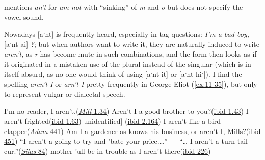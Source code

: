 \citet[\href{https://archive.org/details/bim_eighteenth-century_the-principles-of-the-en_elphinston-james_1765_1/page/134/mode/2up?view=theater&q=sink}{1.134}]{elphinston1765principles} 
mentions \textit{an't} for \textit{am not} with ``sinking'' of \textit{m} and \textit{o} but does not specify the vowel sound.


Nowadays [aˑnt] is frequently heard, especially in tag-questions: \textit{I'm a bad boy,} [aˑnt ai] \textit{?}; but when authors want to write it, they are naturally induced to write \textit{aren't}, as \textit{r} has become mute in such combinations, and the form then looks as if it originated in a mistaken use of the plural instead of the singular (which is in itself absurd, as no one would think of using [aˑnt it] or [aˑnt hiˑ]). I find the spelling \textit{aren't I} or \textit{arn't I} pretty frequently in George Eliot (\ref{ex:11-35}), but only to represent vulgar or dialectal speech.

\ea \label{ex:11-35}
\ea
I'm no reader, I aren't.\hfill(\href{https://archive.org/details/millonfloss0009geor/page/28/mode/2up?q=%22aren%27t%22&view=theater}{\textit{Mill} 1.34})
\ex Aren't I a good brother to you?\hfill(\href{https://archive.org/details/millonfloss0009geor/page/36/mode/2up?q=%22aren%27t%22&view=theater}{ibid 1.43})
\ex I aren't frighted\hfill(\href{https://archive.org/details/millonfloss0009geor/page/52/mode/2up?q=%22aren%27t%22&view=theater}{ibid 1.63})
\ex {[}unidentified{]} \hfill(\href{}{ibid 2.164}) %
\ex I aren't like a bird-clapper\hfill(\href{https://archive.org/details/adambede00eliouoft/page/n463/mode/2up?q=%22aren%27t%22&view=theater}{\textit{Adam} 441})
\ex Am I a gardener as knows his business, or aren't I, Mills?\hfill(\href{https://archive.org/details/adambede00eliouoft/page/n473/mode/2up?q=%22aren%27t%22&view=theater}{ibid 451})
\ex ``I aren't a-going to try and 'bate your price.{\dots}'' --- ``{\dots} I aren't a turn-tail cur.''\hfill(\href{https://archive.org/details/silasmarnerbygeo00elio/page/58/mode/2up?q=%22aren%27t%22&view=theater}{\textit{Silas} 84})
\ex mother 'ull be in trouble as I aren't there\hfill(\href{https://archive.org/details/silasmarnerbygeo00elio/page/156/mode/2up?q=%22aren%27t%22&view=theater}{ibid 226})
\z \z
{}

